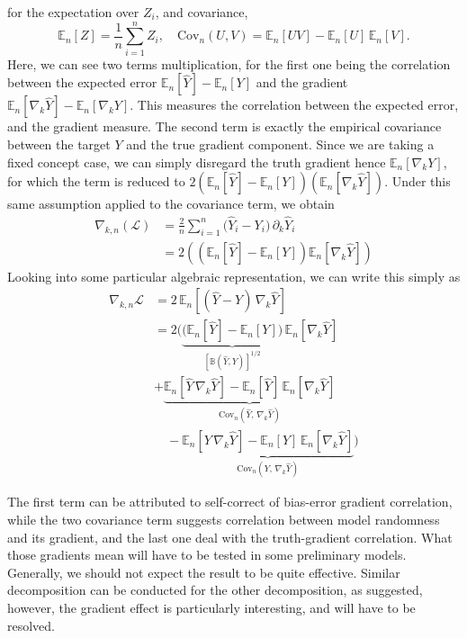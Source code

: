 for the expectation over $Z_{i}$, and covariance, 
\begin{equation}
    \mathbb{E}_n[Z] = \frac{1}{n} \sum_{i=1}^n Z_i,
\quad
\mathrm{Cov}_n(U,V) = \mathbb{E}_n[UV] - \mathbb{E}_n[U] \,\mathbb{E}_n[V].
\end{equation}
Here, we can see two terms multiplication, for the first one being the correlation between the expected error $\mathbb{E}_n[\hat{Y}] - \mathbb{E}_n[Y]$ and the gradient $\mathbb{E}_n[\nabla_k \hat{Y}] - \mathbb{E}_n[\nabla_k Y]$. This measures the correlation between the expected error, and the gradient measure. The second term is exactly the empirical covariance between the target $Y$ and the true gradient component. Since we are taking a fixed concept case, we can simply disregard the truth gradient hence $\mathbb{E}_n[\nabla_k Y]$, for which the term is reduced to $2\left( \mathbb{E}_n[\hat{Y}] - \mathbb{E}_n[Y] \right) \left( \mathbb{E}_n[\nabla_k \hat{Y}] \right)$. Under this same assumption applied to the covariance term, we obtain
\begin{equation}
    \begin{split}
        \nabla_{k,n}(\mathcal{L}) 
&= \frac{2}{n}\sum_{i=1}^n \big(\hat Y_i - Y_i\big)\,\partial_k \hat Y_i \\
&= 2\left(
   \left( \mathbb{E}_n[\hat{Y}] - \mathbb{E}_n[Y] \right)
   \mathbb{E}_n[\nabla_k \hat{Y}]
\right)
    \end{split}
\end{equation}
Looking into some particular algebraic representation, we can write this simply as
\begin{align}
    \nabla_{k,n}\mathcal{L}
    &= 2\,\mathbb{E}_n\!\left[(\hat Y - Y)\,\nabla_k \hat Y\right] \\
    &= 2\Bigg(
    \underset{\left[\mathbb{B}(\hat{Y},Y)\right]^{1/2}}{\underbrace{\bigl(\mathbb{E}_n[\hat Y] - \mathbb{E}_n[Y]\bigr)}}\,\mathbb{E}_n[\nabla_k \hat Y]\\
    &+ \underset{\mathrm{Cov}_n(\hat Y,\,\nabla_k \hat Y)}{\underbrace{\mathbb{E}_n[\hat Y\,\nabla_k \hat Y] - \mathbb{E}_n[\hat Y]\,\mathbb{E}_n[\nabla_k \hat Y]}}
     \\
    & \quad -\underset{\mathrm{Cov}_n(Y,\,\nabla_k \hat Y)}{\underbrace{\mathbb{E}_n[Y\,\nabla_k \hat Y] - \mathbb{E}_n[Y]\,\mathbb{E}_n[\nabla_k \hat Y]}}
    \Bigg)
\end{align}

The first term can be attributed to self-correct of bias-error gradient correlation, while the two covariance term suggests correlation between model randomness and its gradient, and the last one deal with the truth-gradient correlation. What those gradients mean will have to be tested in some preliminary models. Generally, we should not expect the result to be quite effective. Similar decomposition can be conducted for the other decomposition, as suggested, however, the gradient effect is particularly interesting, and will have to be resolved. 

